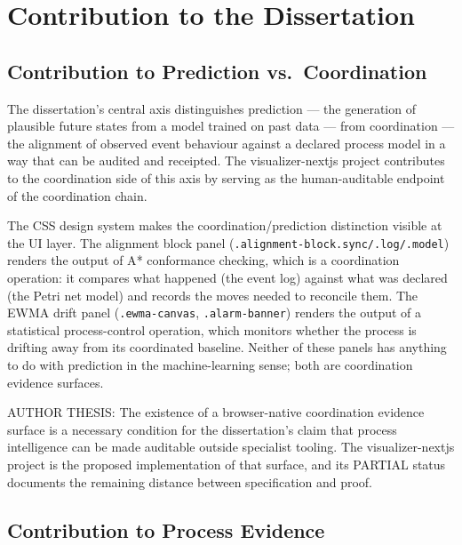 
\section{Contribution to the Dissertation}
\label{sec:experiments-visualizer-nextjs-contribution}

\subsection{Contribution to Prediction vs.~Coordination}
\label{sec:experiments-visualizer-nextjs-contribution-prediction}

The dissertation's central axis distinguishes prediction --- the generation of plausible
future states from a model trained on past data --- from coordination --- the alignment of
observed event behaviour against a declared process model in a way that can be audited and
receipted. The visualizer-nextjs project contributes to the coordination side of this axis
by serving as the human-auditable endpoint of the coordination chain.

The CSS design system makes the coordination/prediction distinction visible at the UI layer.
The alignment block panel (\texttt{.alignment-block.sync/.log/.model}) renders the output
of A{*} conformance checking, which is a coordination operation: it compares what happened
(the event log) against what was declared (the Petri net model) and records the moves needed
to reconcile them. The EWMA drift panel (\texttt{.ewma-canvas}, \texttt{.alarm-banner})
renders the output of a statistical process-control operation, which monitors whether the
process is drifting away from its coordinated baseline. Neither of these panels has
anything to do with prediction in the machine-learning sense; both are coordination
evidence surfaces.

AUTHOR THESIS: The existence of a browser-native coordination evidence surface is a
necessary condition for the dissertation's claim that process intelligence can be made
auditable outside specialist tooling. The visualizer-nextjs project is the proposed
implementation of that surface, and its PARTIAL status documents the remaining distance
between specification and proof.

\subsection{Contribution to Process Evidence}
\label{sec:experiments-visualizer-nextjs-contribution-evidence}

